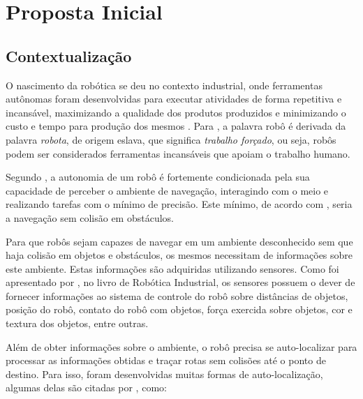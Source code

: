 
\chapter[Proposta Inicial]{Proposta Inicial}

\section{Contextualização}
	
	O nascimento da robótica se deu no contexto industrial, onde ferramentas autônomas foram desenvolvidas para executar atividades de forma repetitiva e incansável, maximizando a qualidade dos produtos produzidos e minimizando o custo e tempo para produção dos mesmos \cite{roboticaIndustrial}. Para \cite{roboticaIndustrial}, a palavra robô é derivada da palavra \textit{robota}, de origem eslava, que significa \textit{trabalho forçado}, ou seja, robôs podem ser considerados ferramentas incansáveis que apoiam o trabalho humano. 

	Segundo \cite{localizacaoEMapeamentoPaulo}, a autonomia de um robô é fortemente condicionada pela sua capacidade de perceber o ambiente de navegação, interagindo com o meio e realizando tarefas com o mínimo de precisão. Este mínimo, de acordo com \cite{localizacaoEMapeamentoPaulo}, seria a navegação sem colisão em obstáculos. 

	Para que robôs sejam capazes de navegar em um ambiente desconhecido sem que haja colisão em objetos e obstáculos, os mesmos necessitam de informações sobre este ambiente. Estas informações são adquiridas utilizando sensores. Como foi apresentado por \cite{interacaoRoboAmbiente}, no livro de Robótica Industrial, os sensores possuem o dever de fornecer informações ao sistema de controle do robô sobre distâncias de objetos, posição do robô, contato do robô com objetos, força exercida sobre objetos, cor e textura dos objetos, entre outras.

	Além de obter informações sobre o ambiente, o robô precisa se auto-localizar para processar as informações obtidas e traçar rotas sem colisões até o ponto de destino. Para isso, foram desenvolvidas muitas formas de auto-localização, algumas delas são citadas por \cite{roboBulldozerIV}, como:

